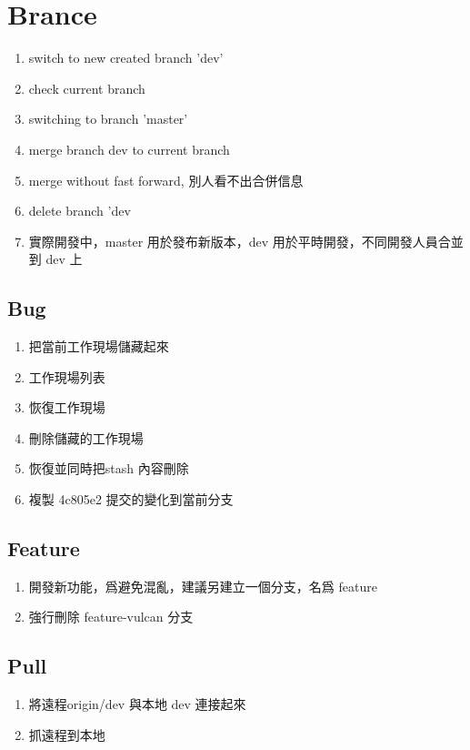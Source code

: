 \section{Brance}
\begin{enumerate}
\item{} switch to new created branch 'dev'
\item{} check current branch
\item{} switching to branch 'master'
\item{} merge branch dev to current branch
\item{} merge without fast forward, 別人看不出合併信息
\item{} delete branch 'dev
\item 實際開發中，master 用於發布新版本，dev 用於平時開發，不同開發人員合並到 dev 上
\end{enumerate}

\subsection{Bug}
\begin{enumerate}
\item{} 把當前工作現場儲藏起來 
\item{} 工作現場列表
\item{} 恢復工作現場
\item{} 刪除儲藏的工作現場
\item{} 恢復並同時把stash 內容刪除
\item{} 複製 4c805e2 提交的變化到當前分支
\end{enumerate}

\subsection{Feature}
\begin{enumerate}
\item 開發新功能，爲避免混亂，建議另建立一個分支，名爲 feature 
\item{} 強行刪除 feature-vulcan 分支
\end{enumerate}

\subsection{Pull}
\begin{enumerate}
\item{} 將遠程origin/dev 與本地 dev 連接起來
\item{} 抓遠程到本地 
\end{enumerate}

